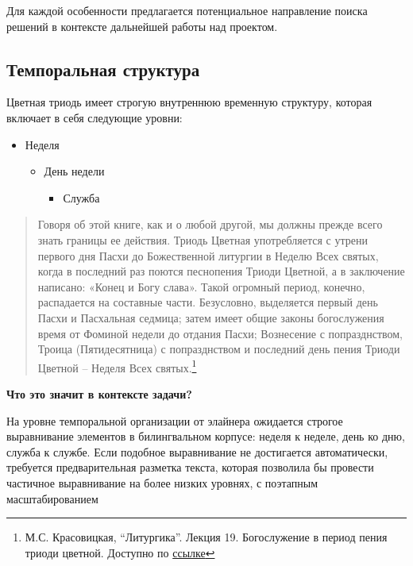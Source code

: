 \documentclass[
  letterpaper,
]{book}
\providecommand{\tightlist}{%
  \setlength{\itemsep}{0pt}\setlength{\parskip}{0pt}}\usepackage{longtable,booktabs,array}
\begin{document}
Для каждой особенности предлагается потенциальное направление поиска
решений в контексте дальнейшей работы над проектом.

\hypertarget{sec-temporal_structure}{%
\subsection{Темпоральная структура}\label{sec-temporal_structure}}

Цветная триодь имеет строгую внутреннюю временную структуру, которая
включает в себя следующие уровни:

\begin{itemize}
\item
  Неделя

  \begin{itemize}
  \item
    День недели

    \begin{itemize}
    \tightlist
    \item
      Служба
    \end{itemize}
  \end{itemize}
\end{itemize}

\begin{quote}
Говоря об этой книге, как и о любой другой, мы должны прежде всего знать
границы ее действия. Триодь Цветная употребляется с утрени первого дня
Пасхи до Божественной литургии в Неделю Всех святых, когда в последний
раз поются песнопения Триоди Цветной, а в заключение написано: «Конец и
Богу слава». Такой огромный период, конечно, распадается на составные
части. Безусловно, выделяется первый день Пасхи и Пасхальная седмица;
затем имеет общие законы богослужения время от Фоминой недели до отдания
Пасхи; Вознесение с попразднством, Троица (Пятидесятница) с
попразднством и последний день пения Триоди Цветной -- Неделя Всех
святых.\footnote{М.С. Красовицкая, ``Литургика''. Лекция 19.
  Богослужение в период пения триоди цветной. Доступно по
  \href{https://azbyka.ru/otechnik/Pravoslavnoe_Bogosluzhenie/liturgika-krasovitskaja/19}{ссылке}}
\end{quote}

\begin{tcolorbox}[enhanced jigsaw, rightrule=.15mm, breakable, colframe=quarto-callout-note-color-frame, colback=white, leftrule=.75mm, left=2mm, arc=.35mm, opacityback=0, toprule=.15mm, bottomrule=.15mm]

\textbf{Что это значит в контексте задачи?}\vspace{2mm}

На уровне темпоральной организации от элайнера ожидается строгое
выравнивание элементов в билингвальном корпусе: неделя к неделе, день ко
дню, служба к службе. Если подобное выравнивание не достигается
автоматически\footnotemark{}, требуется предварительная разметка текста,
которая позволила бы провести частичное выравнивание на более низких
уровнях, с поэтапным масштабированием

\end{tcolorbox}
\end{document}
